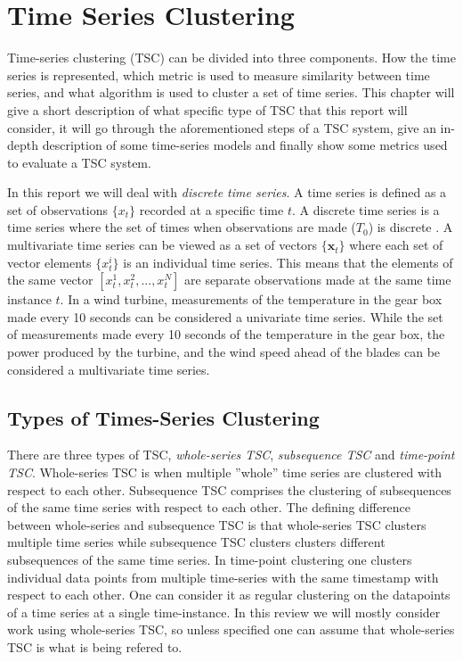 \chapter{Time Series Clustering}
Time-series clustering (TSC) can be divided into three components. How the time series is represented, which metric is used to measure similarity between time series, and what algorithm is used to cluster a set of time series. This chapter will give a short description of what specific type of TSC that this report will consider, it will go through the aforementioned steps of a TSC system, give an in-depth description of some time-series models and finally show some metrics used to evaluate a TSC system. \bigskip

In this report we will deal with \textit{discrete time series}. A time series is defined as a set of observations $\{x_t\}$ recorded at a specific time $t$. A discrete time series is a time series where the set of times when observations are made ($T_0$) is discrete \cite{brockwell_davis_advanced}. A multivariate time series can be viewed as a set of vectors $\{\mathbf{x}_t\}$ where each set of vector elements $\{x^i_t\}$ is an individual time series. This means that the elements of the same vector $[x^1_t, x^2_t,...,x^N_t]$ are separate observations made at the same time instance $t$. In a wind turbine, measurements of the temperature in the gear box made every 10 seconds can be considered a univariate time series. While the set of measurements made every 10 seconds of the temperature in the gear box, the power produced by the turbine, and the wind speed ahead of the blades can be considered a multivariate time series.

\section{Types of Times-Series Clustering}
There are three types of TSC, \textit{whole-series TSC}, \textit{subsequence TSC} and \textit{time-point TSC}. Whole-series TSC is when multiple ''whole'' time series are clustered with respect to each other. Subsequence TSC comprises the clustering of subsequences of the same time series with respect to each other. The defining difference between whole-series and subsequence TSC is that whole-series TSC clusters multiple time series while subsequence TSC clusters clusters different subsequences of the same time series. In time-point clustering one clusters individual data points from multiple time-series with the same timestamp with respect to each other. One can consider it as regular clustering on the datapoints of a time series at a single time-instance. In this review we will mostly consider work using whole-series TSC, so unless specified one can assume that whole-series TSC is what is being refered to.

